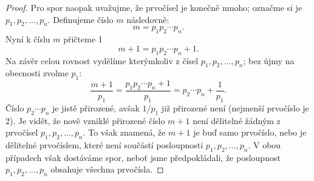 \begin{proof}
    Pro spor naopak uvažujme, že prvočísel je konečně mnoho; označme si je $p_1, p_2, \dots, p_n$. Definujeme číslo $m$ následovně:
    \begin{equation*}
        m=p_1p_2\cdots p_n.
    \end{equation*}
    Nyní k číslu $m$ přičteme 1
    \begin{equation*}
        m+1=p_1p_2\cdots p_n+1.
    \end{equation*}
    Na závěr celou rovnost vydělíme kterýmkoliv z čísel $p_1, p_2, \dots, p_n$; bez újmy na obecnosti zvolme $p_1$:
    \begin{equation*}
        \dfrac{m+1}{p_1}=\dfrac{p_1p_2\cdots p_n+1}{p_1}=p_2\cdots p_n+\dfrac{1}{p_1}.
    \end{equation*}
    Číslo $p_2\cdots p_n$ je jistě přirozené, avšak $1/p_1$ již přirozené není (nejmenší prvočíslo je 2). Je vidět, že nově vzniklé přirozené číslo $m+1$ není dělitelné žádným z prvočísel $p_1, p_2, \dots, p_n$. To však znamená, že $m+1$ je buď samo prvočíslo, nebo je dělitelné prvočíslem, které není součástí posloupnosti $p_1, p_2, \dots, p_n$. V obou případech však dostáváme spor, neboť jsme předpokládali, že posloupnost $p_1, p_2, \dots, p_n$ obsahuje všechna prvočísla.
\end{proof}

